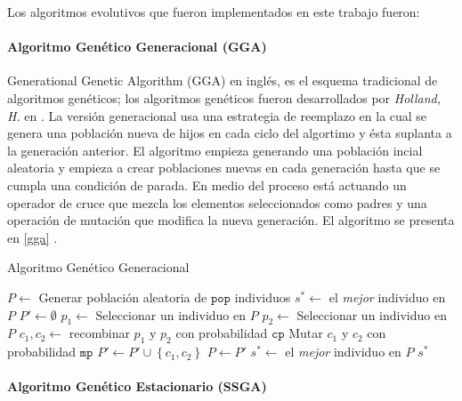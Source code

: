 Los algoritmos evolutivos que fueron implementados en este trabajo fueron:

\paragraph{Algoritmo Genético Generacional (GGA)}

 Generational Genetic Algorithm (GGA) en inglés, es el esquema tradicional de algoritmos genéticos; los algoritmos genéticos fueron desarrollados por \emph{Holland, H.} en \cite{holland1975adaptation}. La versión generacional usa una estrategia de reemplazo en la cual se genera una población nueva de hijos en cada ciclo del algortimo y ésta suplanta a la generación anterior. El algoritmo empieza generando una población incial aleatoria y empieza a crear poblaciones nuevas en cada generación hasta que se cumpla una condición de parada. En medio del proceso está actuando un operador de cruce que mezcla los elementos seleccionados como padres y una operación de mutación que modifica la nueva generación. El algoritmo se presenta en \ref{gga} \cite{flores2014metaheuristics}.

\begin{algorithm}
\caption{Algoritmo Genético Generacional}
\label{gga}
\begin{algorithmic}[1]


\State $P \gets$ Generar población aleatoria de $\texttt{pop}$ individuos
\State $s^* \gets $ el \emph{mejor} individuo en $P$
	\State $P' \gets \emptyset$
		\State $p_1 \gets$ Seleccionar un individuo en $P$
		\State $p_2 \gets$ Seleccionar un individuo en $P$
		\State $c_1, c_2 \gets $ recombinar $p_1$ y $p_2$ con probabilidad $\texttt{cp}$
		\State Mutar $c_1$ y $c_2$ con probabilidad $\texttt{mp}$
		\State $P' \gets P' \cup \left\lbrace c_1, c_2 \right\rbrace$
	\EndWhile
	\State $P \gets P'$
		\State $s^* \gets$ el \emph{mejor} individuo en $P$
	\EndIf
\EndWhile
\State \Return $s^*$

\end{algorithmic}
\end{algorithm}

\paragraph{Algoritmo Genético Estacionario (SSGA)}

